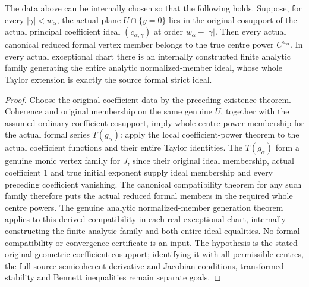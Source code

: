 \begin{theorem}
\label{hir:actual-original-vertex-coefficient-cosupport-strict-generators}
\leanok
The data above can be internally chosen so that the following holds.
Suppose, for every $|\gamma|<w_\alpha$, the actual plane
$U\cap\{y=0\}$ lies in the original cosupport of the actual principal
coefficient ideal $(c_{\alpha,\gamma})$ at order
$w_\alpha-|\gamma|$. Then every actual canonical reduced formal vertex
member belongs to the true centre power $C^{w_\alpha}$.
In every actual exceptional chart there is an internally constructed finite
analytic family generating the entire analytic normalized-member ideal,
whose whole Taylor extension is exactly the source formal strict ideal.
\end{theorem}
\begin{proof}
Choose the original coefficient data by the preceding existence theorem.
Coherence and original membership on the same genuine $U$, together with
the assumed ordinary coefficient cosupport, imply whole centre-power
membership for the actual formal series $T(g_\alpha)$: apply the local
coefficient-power theorem to the actual coefficient functions and their
entire Taylor identities. The $T(g_\alpha)$ form a genuine monic vertex
family for $J$, since their original ideal membership, actual coefficient
$1$ and true initial exponent supply ideal membership and every preceding
coefficient vanishing. The canonical compatibility theorem for any such
family therefore puts the actual reduced formal members in the required
whole centre powers. The genuine analytic normalized-member generation
theorem applies to this derived compatibility in each real exceptional
chart, internally constructing the finite analytic family and both entire
ideal equalities. No formal compatibility or convergence certificate is
an input. The hypothesis is the stated original geometric coefficient
cosupport; identifying it with all permissible centres, the full source
semicoherent derivative and Jacobian conditions, transformed stability and
Bennett inequalities remain separate goals.
\end{proof}
